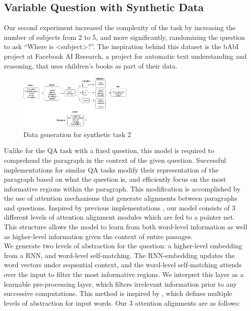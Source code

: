 \documentclass{article}
\begin{document}
\subsection{Variable Question with Synthetic Data}
Our second experiment increased the complexity of the task by increasing the number of subjects from 2 to 5, and more significantly, randomizing the question to ask ``Where is \textless subject\textgreater?''. The inspiration behind this dataset is the bAbI \cite{bAbI} project at Facebook AI Research, a project for automatic text understanding and reasoning, that uses children's books as part of their data.

\begin{figure}[h]
	\includegraphics[width=0.5\textwidth]{fake_data2.png}
	\centering
	\caption{Data generation for synthetic task 2}
	\label{fig:fakeData2}
\end{figure}

Unlike for the QA task with a fixed question, this model is required to comprehend the paragraph in the context of the given question. Successful implementations for similar QA tasks modify their representation of the paragraph based on what the question is, and efficiently focus on the most informative regions within the paragraph. This modification is accomplished by the use of attention mechanisms that generate alignments between paragraphs and questions. Inspired by previous implementations \cite{BiDAF}, our model consists of 3 different levels of attention alignment modules which are fed to a pointer net. This structure allows the model to learn from both word-level information as well as higher-level information given the context of entire passages. \\

We generate two levels of abstraction for the question: a higher-level embedding from a RNN, and word-level self-matching. The RNN-embedding updates the word vectors under sequential context, and the word-level self-matching attends over the input to filter the most informative regions. We interpret this layer as a learnable pre-processing layer, which filters irrelevant information prior to any successive computations. This method is inspired by \cite{FusionNet}, which defines multiple levels of abstraction for input words. Our 3 attention alignments are as follows:
\end{document}
